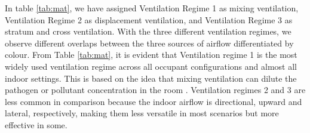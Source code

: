 \documentclass[preprint,12pt]{elsarticle}
\begin{document}
In table \ref{tab:mat}, we have assigned Ventilation Regime 1 as mixing ventilation, Ventilation Regime 2 as displacement ventilation, and Ventilation Regime 3 as stratum and cross ventilation. With the three different ventilation regimes, we observe different overlaps between the three sources of airflow differentiated by colour. From Table \ref{tab:mat}, it is evident that Ventilation regime 1 is the most widely used ventilation regime across all occupant configurations and almost all indoor settings. This is based on the idea that mixing ventilation can dilute the pathogen or pollutant concentration in the room \cite{srivastava2021effective}. Ventilation regimes 2 and 3 are less common in comparison because the indoor airflow is directional, upward and lateral, respectively, making them less versatile in most scenarios but more effective in some.
\end{document}
